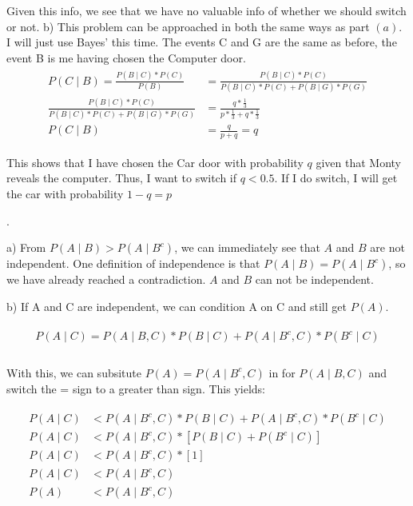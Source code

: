 \documentclass[11pt]{article}
\begin{document}
	Given this info, we see that we have no valuable info of whether we should switch or not. 
\smallskip
	b) This problem can be approached in both the same ways as part $(a)$.  I will just use Bayes' this time. The events C and G are the same as before, the event B is me having chosen the Computer door.  
	\begin{gather*}
	\begin{align*}
		P(C \mid B) = \frac{P(B \mid C)*P(C)}{P(B)} &= \frac{P(B \mid C)*P(C)}{P(B \mid C)*P(C) + P(B \mid G)*P(G)}
		\\
		\frac{P(B \mid C)*P(C)}{P(B \mid C)*P(C) + P(B \mid G)*P(G)} &= \frac{q*\frac{1}{3}}{p*\frac{1}{3} + q*\frac{1}{3}}
		\\
		P(C \mid B) &= \frac{q}{p+q} = q
	\end{align*}
	\end{gather*}

	This shows that I have chosen the Car door with probability $q$ given that Monty reveals the computer.  Thus, I want to switch if $q<0.5$. If I do switch, I will get the car with probability $1-q = \boxed{p}$
\bigskip

.

	a) From $P(A \mid B) > P(A \mid B^c)$, we can immediately see that $A$ and $B$ are not independent. One definition of independence is that $P(A \mid B) = P(A \mid B^c)$, so we have already reached a contradiction.  $A$ and $B$ can not be independent.

\smallskip

    b) If A and C are independent, we can condition A on C and still get $P(A)$.  

    \begin{gather*}
    \begin{align*}
        P(A \mid C) = P(A \mid B,C)*P(B \mid C) + P(A \mid B^c,C)*P(B^c \mid C) \\
    \end{align*}
    \end{gather*}

    With this, we can subsitute $P(A) = P(A \mid B^c,C)$ in for $P(A \mid B,C)$ and switch the = sign to a greater than sign.  This yields: 

    \begin{gather*}
    \begin{align*}
    P(A \mid C) &< P(A \mid B^c,C)*P(B \mid C) + P(A \mid B^c,C)*P(B^c \mid C)\\
    P(A \mid C) &< P(A \mid B^c,C)*[P(B \mid C) + P(B^c \mid C)]\\
    P(A \mid C) &< P(A \mid B^c,C)*[1]\\
    P(A \mid C) &< P(A \mid B^c,C)\\
    P(A) &< P(A \mid B^c,C)
    \end{align*}
    \end{gather*}
\end{document}

